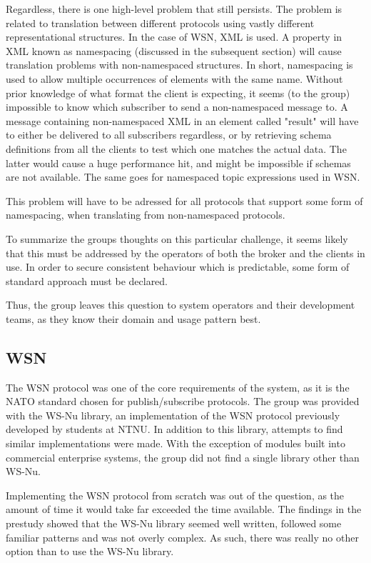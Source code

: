 Regardless, there is one high-level problem that still persists. The problem is related to translation between different protocols using vastly different representational structures. In the case of WSN, XML is used. A property in XML known as namespacing (discussed in the subsequent section) will cause translation problems with non-namespaced structures. In short, namespacing is used to allow multiple occurrences of elements with the same name. Without prior knowledge of what format the client is expecting, it seems (to the group) impossible to know which subscriber to send a non-namespaced message to. A message containing non-namespaced XML in an element called "result" will have to either be delivered to all subscribers regardless, or by retrieving schema definitions from all the clients to test which one matches the actual data. The latter would cause a huge performance hit, and might be impossible if schemas are not available. The same goes for namespaced topic expressions used in WSN.

This problem will have to be adressed for all protocols that support some form of namespacing, when translating from non-namespaced protocols.

To summarize the groups thoughts on this particular challenge, it seems likely that this must be addressed by the operators of both the broker and the clients in use. In order to secure consistent behaviour which is predictable, some form of standard approach must be declared.

Thus, the group leaves this question to system operators and their development teams, as they know their domain and usage pattern best.

\subsection{WSN}
\label{subsec:evaluation-implementation-wsn}

The WSN protocol was one of the core requirements of the system, as it is the NATO standard chosen for publish/subscribe protocols. The group was provided with the WS-Nu library, an implementation of the WSN protocol previously developed by students at NTNU. In addition to this library, attempts to find similar implementations were made. With the exception of modules built into commercial enterprise systems, the group did not find a single library other than WS-Nu.

Implementing the WSN protocol from scratch was out of the question, as the amount of time it would take far exceeded the time available. The findings in the prestudy showed that the WS-Nu library seemed well written, followed some familiar patterns and was not overly complex. As such, there was really no other option than to use the WS-Nu library.

